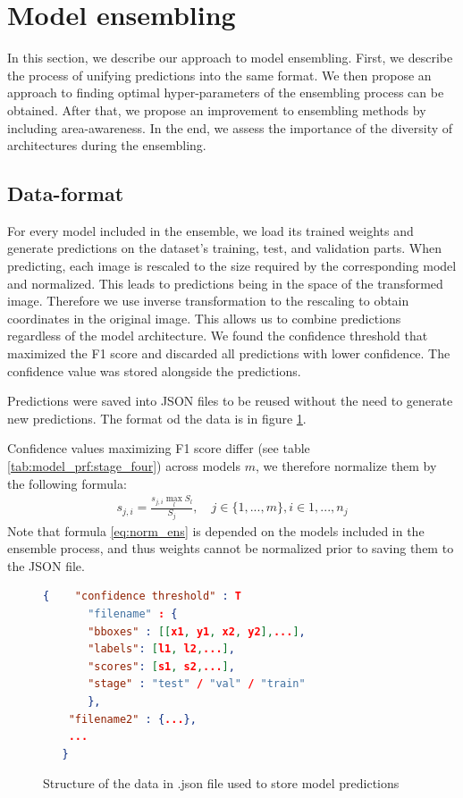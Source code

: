 \section{Model ensembling}
\label{sec:model_ensemling}
In this section, we describe our approach to model ensembling. First, we describe the process of unifying predictions into the same format. We then propose an approach to finding optimal hyper-parameters of the ensembling process can be obtained. After that, we propose an improvement to ensembling methods by including area-awareness. In the end, we assess the importance of the diversity of architectures during the ensembling.

\subsection{Data-format}
For every model included in the ensemble, we load its trained weights and generate predictions on the dataset's training, test, and validation parts. When predicting, each image is rescaled to the size required by the corresponding model and normalized. This leads to predictions being in the space of the transformed image. Therefore we use inverse transformation to the rescaling to obtain coordinates in the original image. This allows us to combine predictions regardless of the model architecture. We found the confidence threshold that maximized the F1 score and discarded all predictions with lower confidence. The confidence value was stored alongside the predictions.

Predictions were saved into JSON files to be reused without the need to generate new predictions. The format od the data is in figure \ref{fig:predictions_json}.

Confidence values maximizing F1 score differ (see table \ref{tab:model_prf:stage_four}) across models $m$, we therefore normalize them by the following formula:
\begin{align}
    s_{j,i} = \frac{s_{j,i} \max_l S_l}{  S_j}, \quad j \in \{ 1,...,m\}, i \in {1,...,n_j}
    \label{eq:norm_ens}
\end{align}
Note that formula \ref{eq:norm_ens} is depended on the models included in the ensemble process, and thus weights cannot be normalized prior to saving them to the JSON file.

\begin{figure}[h]
    \centering
    \begin{lstlisting}[language=json, numbers=none]
   {    "confidence threshold" : T
       "filename" : {
       "bboxes" : [[x1, y1, x2, y2],...],
       "labels": [l1, l2,...],
       "scores": [s1, s2,...],
       "stage" : "test" / "val" / "train"
       },
    "filename2" : {...},
    ...
   }
\end{lstlisting}
    \caption{Structure of the data in .json file used to store model predictions}
    \label{fig:predictions_json}
\end{figure}

